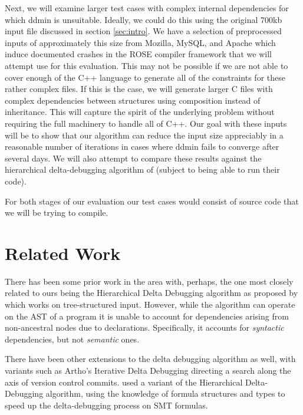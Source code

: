 \documentclass[preprint]{acm_proc_article-sp}
\begin{document}
Next, we will examine larger test cases with complex internal dependencies for
which ddmin is unsuitable.  Ideally, we could do this using the original 700kb
input file discussed in section \ref{sec:intro}.  We have a selection of
preprocessed inputs of approximately this size from Mozilla, MySQL, and Apache
which induce documented crashes in the ROSE compiler framework \citep{rose} that
we will attempt use for this evaluation.  This may not be possible if we are not
able to cover enough of the C++ language to generate all of the constraints for
these rather complex files.  If this is the case, we will generate larger C
files with complex dependencies between structures using composition instead of
inheritance.  This will capture the spirit of the underlying problem without
requiring the full machinery to handle all of C++.  Our goal with these inputs
will be to show that our algorithm can reduce the input size appreciably in a
reasonable number of iterations in cases where ddmin fails to converge after
several days. We will also attempt to compare these results against the
hierarchical delta-debugging algorithm of \citeauthor{hdd} (subject to being
able to run their code).

For both stages of our evaluation our test cases would consist of source code
that we will be trying to compile.


\section{Related Work}

There has been some prior work in the area with, perhaps, the one most closely
related to ours being the Hierarchical Delta Debugging algorithm as proposed by
\citet{hdd} which works on tree-structured input. However, while
the algorithm can operate on the AST of a program it is unable to account for
dependencies arising from non-ancestral nodes due to declarations. Specifically,
it accounts for \emph{syntactic} dependencies, but not \emph{semantic} ones.

There have been other extensions to the delta debugging algorithm as well, with
variants such as Artho's Iterative Delta Debugging \citep{idd} directing a search
along the axis of version control commits. \citet{smt} used a
variant of the Hierarchical Delta-Debugging algorithm, using the knowledge of
formula structures and types to speed up the delta-debugging process on SMT
formulas.
\end{document}
